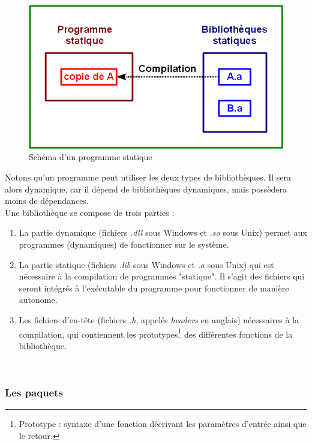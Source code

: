\begin{figure}[!h]
	\center
	\includegraphics[scale=0.5]{images/Bibliotheque_statique.png}
	\caption{Schéma d'un programme statique}
	\label{Schéma Bibliothèque statique}
\end{figure}

Notons qu'un programme peut utiliser les deux types de bibliothèques.
Il sera alors dynamique, car il dépend de bibliothèques dynamiques, mais possèdera moins de dépendances.
\\


Une bibliothèque se compose de trois parties :
\begin{enumerate}
	\item La partie dynamique (fichiers \textit{.dll} sous Windows et \textit{.so} sous Unix) permet aux programmes (dynamiques) de fonctionner sur le système.
	\item La partie statique (fichiers \textit{.lib} sous Windows et \textit{.a} sous Unix) qui est nécessaire à la compilation de programmes "statique".
Il s'agit des fichiers qui seront intégrés à l'exécutable du programme pour fonctionner de manière autonome.
	\item Les fichiers d'en-tête (fichiers \textit{.h}, appelés \textit{headers} en anglais) nécessaires à la compilation, qui contiennent les prototypes\footnote{Prototype : syntaxe d'une fonction décrivant les paramètres d'entrée ainsi que le retour.} des différentes fonctions de la bibliothèque.
\end{enumerate}
~~\\




\subsubsection{Les paquets}

